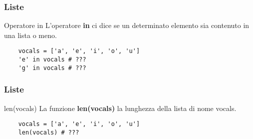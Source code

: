 \begin{frame}[fragile]
\frametitle{Liste}
    \begin{block}{Operatore in}
    L'operatore \textbf{in} ci dice se un determinato elemento sia contenuto in una lista o meno.
    \end{block}
    
    \begin{lstlisting}
    vocals = ['a', 'e', 'i', 'o', 'u']
    'e' in vocals # ???
    'g' in vocals # ???
    \end{lstlisting}
\end{frame}

\begin{frame}[fragile]
\frametitle{Liste}
    \begin{block}{len(vocals)}
    La funzione \textbf{len(vocals)} la lunghezza della lista di nome vocals.
    \end{block}
    
    \begin{lstlisting}
    vocals = ['a', 'e', 'i', 'o', 'u']
    len(vocals) # ???
    \end{lstlisting}
\end{frame}
